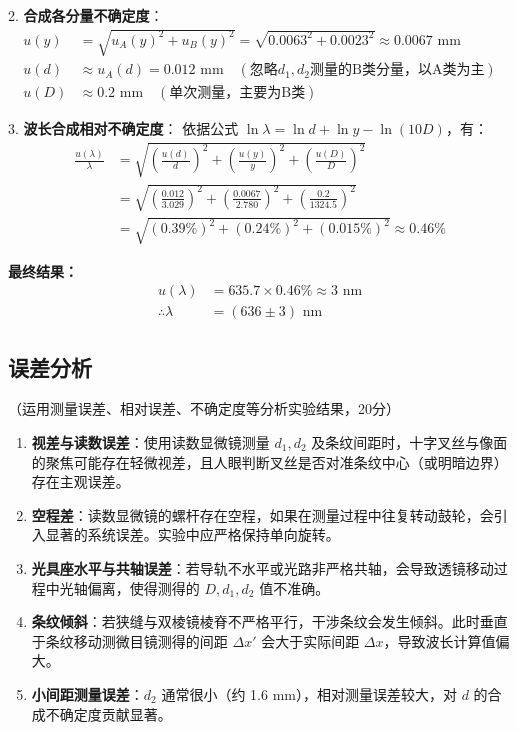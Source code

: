 \documentclass[10pt,a4paper]{ctexart}
\newcommand{\xiaosi}{\fontsize{12pt}{16pt}\selectfont}
\begin{document}
    2. \textbf{合成各分量不确定度}：
       \begin{align*}
           u(y) &= \sqrt{u_A(y)^2 + u_B(y)^2} = \sqrt{0.0063^2 + 0.0023^2} \approx 0.0067 \text{ mm} \\
           u(d) &\approx u_A(d) = 0.012 \text{ mm} \quad (\text{忽略} d_1, d_2 \text{测量的B类分量，以A类为主}) \\
           u(D) &\approx 0.2 \text{ mm} \quad (\text{单次测量，主要为B类})
       \end{align*}

    3. \textbf{波长合成相对不确定度}：
       依据公式 $\ln \lambda = \ln d + \ln y - \ln(10D)$，有：
       \begin{align*}
           \frac{u(\lambda)}{\lambda} &= \sqrt{\left(\frac{u(d)}{d}\right)^2 + \left(\frac{u(y)}{y}\right)^2 + \left(\frac{u(D)}{D}\right)^2} \\
           &= \sqrt{\left(\frac{0.012}{3.029}\right)^2 + \left(\frac{0.0067}{2.780}\right)^2 + \left(\frac{0.2}{1324.5}\right)^2} \\
           &= \sqrt{(0.39\%)^2 + (0.24\%)^2 + (0.015\%)^2} \approx 0.46\%
       \end{align*}
       
       \textbf{最终结果：}
       \begin{align*}
           u(\lambda) &= 635.7 \times 0.46\% \approx 3 \text{ nm} \\
           \therefore \lambda &= (636 \pm 3) \text{ nm}
       \end{align*}

    \subsection{误差分析}
    \xiaosi （运用测量误差、相对误差、不确定度等分析实验结果，20分）
    
    \begin{enumerate}
        \item \textbf{视差与读数误差}：使用读数显微镜测量 $d_1, d_2$ 及条纹间距时，十字叉丝与像面的聚焦可能存在轻微视差，且人眼判断叉丝是否对准条纹中心（或明暗边界）存在主观误差。
        \item \textbf{空程差}：读数显微镜的螺杆存在空程，如果在测量过程中往复转动鼓轮，会引入显著的系统误差。实验中应严格保持单向旋转。
        \item \textbf{光具座水平与共轴误差}：若导轨不水平或光路非严格共轴，会导致透镜移动过程中光轴偏离，使得测得的 $D, d_1, d_2$ 值不准确。
        \item \textbf{条纹倾斜}：若狭缝与双棱镜棱脊不严格平行，干涉条纹会发生倾斜。此时垂直于条纹移动测微目镜测得的间距 $\Delta x'$ 会大于实际间距 $\Delta x$，导致波长计算值偏大。
        \item \textbf{小间距测量误差}：$d_2$ 通常很小（约 1.6 mm），相对测量误差较大，对 $d$ 的合成不确定度贡献显著。
    \end{enumerate}
\end{document}

